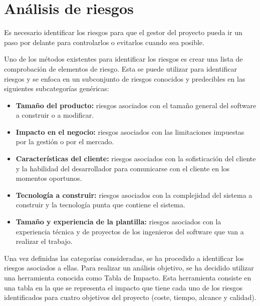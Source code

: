 \section {Análisis de riesgos}
\par Es necesario identificar los riesgos para que el gestor del proyecto pueda ir un paso por delante para controlarlos o evitarlos cuando sea posible.
\par Uno de los métodos existentes para identificar los riesgos es crear una lista de comprobación de elementos de riesgo. Esta se puede utilizar para identificar riesgos y se enfoca en un subconjunto de riesgos conocidos y predecibles en las siguientes subcategorías genéricas:

\begin{itemize}[-]
\item \textbf{Tamaño del producto:} riesgos asociados con el tamaño general del software a construir o a modificar.
\item \textbf{Impacto en el negocio:} riesgos asociados con las limitaciones impuestas por la gestión o por el mercado.
\item \textbf{Características del cliente:} riesgos asociados con la sofisticación del cliente y la habilidad del desarrollador para comunicarse con el cliente en los momentos oportunos.
\item \textbf{Tecnología a construir:} riesgos asociados con la complejidad del sistema a construir y la tecnología punta que contiene el sistema.
\item \textbf{Tamaño y experiencia de la plantilla:} riesgos asociados con la experiencia técnica y de proyectos de los ingenieros del software que van a realizar el trabajo.
\end{itemize}

\par Una vez definidas las categorías consideradas, se ha procedido a identificar los riesgos asociados a ellas. Para realizar un análisis objetivo, se ha decidido utilizar una herramienta conocida como Tabla de Impacto. Esta herramienta consiste en una tabla en la que se representa el impacto que tiene cada uno de los riesgos identificados para cuatro objetivos del proyecto (coste, tiempo, alcance y calidad).

